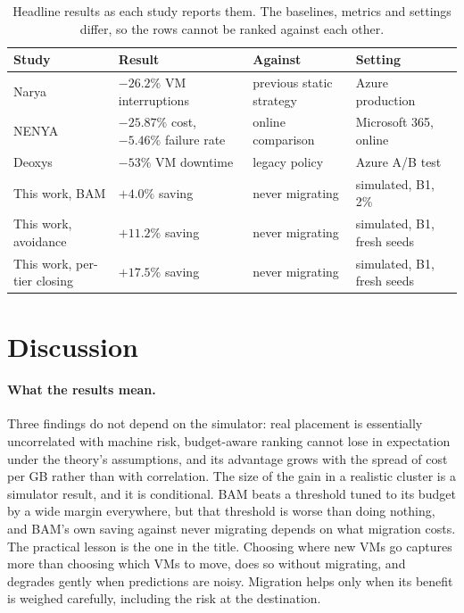 \documentclass[pdflatex,sn-mathphys-num,iicol]{sn-jnl}
\theoremstyle{thmstyleone}%
\theoremstyle{thmstylethree}%
\begin{document}
\begin{table}[!t]\centering
\caption{Headline results as each study reports them. The baselines, metrics and settings differ,
so the rows cannot be ranked against each other.}\label{tab:compare}
\setlength{\tabcolsep}{4pt}\footnotesize
\begin{tabular}{p{}p{}p{}p{}}\toprule
Study & Result & Against & Setting \\ \midrule
Narya~\cite{levy2020narya} & $-26.2\%$ VM interruptions & previous static strategy & Azure production \\
NENYA~\cite{wang2022nenya} & $-25.87\%$ cost, $-5.46\%$ failure rate & online comparison & Microsoft 365, online \\
Deoxys~\cite{zhang2024deoxys} & $-53\%$ VM downtime & legacy policy & Azure A/B test \\ \midrule
This work, BAM & $+4.0\%$ saving & never migrating & simulated, B1, 2\% \\
This work, avoidance & $+11.2\%$ saving & never migrating & simulated, B1, fresh seeds \\
This work, per-tier closing & $+17.5\%$ saving & never migrating & simulated, B1, fresh seeds \\
\bottomrule\end{tabular}
\end{table}

\section{Discussion}\label{sec:discussion}

\paragraph{What the results mean.} Three findings do not depend on the simulator: real placement is
essentially uncorrelated with machine risk, budget-aware ranking cannot lose in expectation under
the theory's assumptions, and its advantage grows with the spread of cost per GB rather than with
correlation. The size of the gain in a realistic cluster is a simulator result, and it is
conditional. BAM beats a threshold tuned to its budget by a wide margin everywhere, but that
threshold is worse than doing nothing, and BAM's own saving against never migrating depends on
what migration costs. The practical lesson is the one in the title. Choosing where new VMs go
captures more than choosing which VMs to move, does so without migrating, and degrades gently when
predictions are noisy. Migration helps only when its benefit is weighed carefully, including the
risk at the destination.
\end{document}
